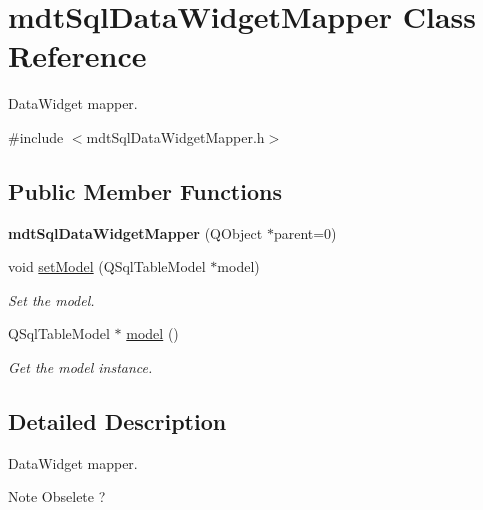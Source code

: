 \hypertarget{classmdt_sql_data_widget_mapper}{
\section{mdtSqlDataWidgetMapper Class Reference}
\label{classmdt_sql_data_widget_mapper}
}


DataWidget mapper.  




{\ttfamily \#include $<$mdtSqlDataWidgetMapper.h$>$}

\subsection*{Public Member Functions}
\begin{DoxyCompactItemize}
\item 
\hypertarget{classmdt_sql_data_widget_mapper_a526266b947f0a787e28b48976bfe3d91}{
{\bfseries mdtSqlDataWidgetMapper} (QObject $\ast$parent=0)}
\label{classmdt_sql_data_widget_mapper_a526266b947f0a787e28b48976bfe3d91}

\item 
void \hyperlink{classmdt_sql_data_widget_mapper_ae32a335edcb2bb37bf86f1f59874a1f4}{setModel} (QSqlTableModel $\ast$model)
\begin{DoxyCompactList}\small\item\em Set the model. \end{DoxyCompactList}\item 
\hypertarget{classmdt_sql_data_widget_mapper_adc6e8948ea3c0e81a35955b516770734}{
QSqlTableModel $\ast$ \hyperlink{classmdt_sql_data_widget_mapper_adc6e8948ea3c0e81a35955b516770734}{model} ()}
\label{classmdt_sql_data_widget_mapper_adc6e8948ea3c0e81a35955b516770734}

\begin{DoxyCompactList}\small\item\em Get the model instance. \end{DoxyCompactList}\end{DoxyCompactItemize}


\subsection{Detailed Description}
DataWidget mapper. 

\begin{DoxyNote}{Note}
Obselete ? 
\end{DoxyNote}


